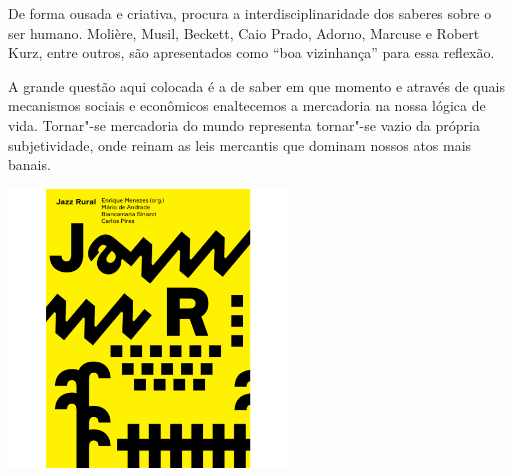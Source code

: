 \hspace*{-7cm}\hrulefill\hspace*{-7cm}

\medskip

\noindent{}De forma ousada e criativa, {} procura a interdisciplinaridade dos saberes sobre o ser humano. Molière, Musil, Beckett, Caio Prado, Adorno, Marcuse e Robert Kurz, entre outros, são apresentados como “boa vizinhança” para essa reflexão. 

A grande questão aqui colocada é a de saber em que momento e através de quais mecanismos sociais e econômicos enaltecemos a mercadoria na nossa lógica de vida. Tornar"-se mercadoria do mundo representa tornar"-se vazio da própria subjetividade, onde reinam as leis mercantis que dominam nossos atos mais banais. 


\vfill

\hspace*{-.4cm}\begin{minipage}[c]{.5\linewidth}
\small{
{}}
\end{minipage}

\pagebreak



\begin{center}
\hspace*{-3.6cm}
\hspace*{3.1cm}\includegraphics[width=74mm]{./grid/jazz.jpg}
\end{center}

